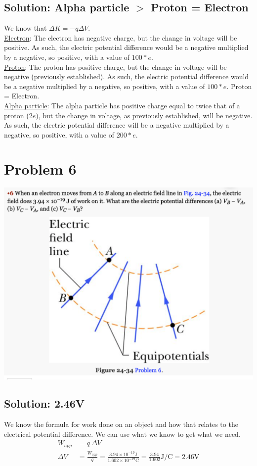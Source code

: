 \documentclass[12pt]{article}
\begin{document}
\subsection{Solution: Alpha particle $>$ Proton = Electron}
We know that $\Delta K = -q \Delta V$.\\
\underline{Electron}: The electron has negative charge, but the change in voltage will be positive.
As such, the electric potential difference would be a negative multiplied by a negative, so positive, with a value of $100*e$.\\
\underline{Proton}: The proton has positive charge, but the change in voltage will be negative (previously established).
As such, the electric potential difference would be a negative multiplied by a negative, so positive, with a value of $100*e$.
Proton = Electron.\\
\underline{Alpha particle}: The alpha particle has positive charge equal to twice that of a proton ($2e$), but the change in voltage, as previously established, will be negative.
As such, the electric potential difference will be a negative multiplied by a negative, so positive, with a value of $200*e$.
\pagebreak

\section{Problem 6}
\includegraphics[width=\textwidth]{picture_6.png}

\subsection{Solution: 2.46V}
We know the formula for work done on an object and how that relates to the electrical potential difference.
We can use what we know to get what we need.
\begin{align*}
    W_{app} &=  q\ \Delta V\\
    \Delta V    &=  \frac{W_{app}}{q}
        =   \frac{3.94 \times 10^{-19} \unit{\joule}}{1.602 \times 10^{-19} \unit{\coulomb}}
        =   \frac{3.94}{1.602} \unit{\joule/\coulomb}
        =   \boxed{2.46 \unit{\volt}}
\end{align*}
\end{document}
